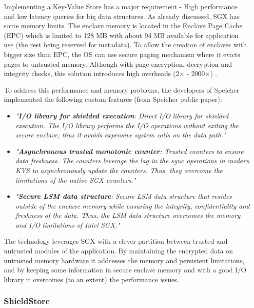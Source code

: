 Implementing a Key-Value Store has a major requirement - High performance and low latency queries for big data structures. As already discussed, \gls{SGX} has some memory limits. The enclave memory is located in the Enclave Page Cache (\gls{EPC}) which is limited to 128 \gls{MB} with about 94 \gls{MB} available for application use (the rest being reserved for metadata). To allow the creation of enclaves with bigger size than \gls{EPC}, the \gls{OS}  can use secure paging mechanism where it evicts pages to untrusted memory. Although with page encryption, decryption and integrity checks, this solution introduces high overheads (2× - 2000×) \cite{scone:1}.

To address this performance and memory problems, the developers of Speicher implemented the following custom features (from Speicher public paper):

\begin{itemize}
	\item \textit{"\textbf{I/O library for shielded execution}: Direct \gls{I/O} library for shielded execution. The \gls{I/O} library performs the \gls{I/O} operations without exiting the secure enclave; thus it avoids expensive system calls on the data path."}
	
	\item \textit{"\textbf{Asynchronous trusted monotonic counter}: Trusted counters to ensure data freshness. The counters leverage the lag in the sync operations in modern \gls{KVS} to asynchronously update the counters. Thus, they overcome the limitations of the native \gls{SGX} counters."}
	
	\item \textit{"\textbf{Secure \gls{LSM} data structure}: Secure \gls{LSM} data structure that resides outside of the enclave memory while ensuring the integrity, confidentiality and freshness of the data. Thus, the \gls{LSM} data structure overcomes the memory and \gls{I/O} limitations of Intel \gls{SGX}."}
\end{itemize}

The technology leverages \gls{SGX} with a clever partition between trusted and untrusted modules of the application. By maintaining the encrypted data on untrusted memory hardware it addresses the memory and persistent limitations, and by keeping some information in secure enclave memory and with a good \gls{I/O} library it overcomes (to an extent) the performance issues.

\subsubsection{ShieldStore}
\label{sssec:shieldstore}


